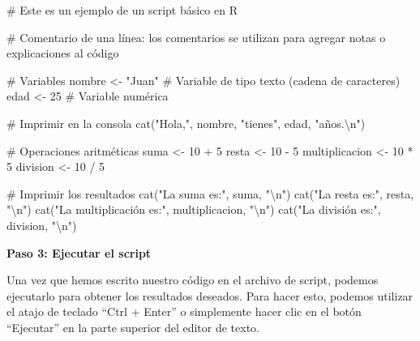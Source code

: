 \documentclass[
  a4paper,
]{article}
\newenvironment{Shaded}{}{}
\newcommand{\CommentTok}[1]{\textcolor[rgb]{0.42,0.45,0.49}{#1}}
\newcommand{\DecValTok}[1]{\textcolor[rgb]{0.00,0.36,0.77}{#1}}
\newcommand{\FunctionTok}[1]{\textcolor[rgb]{0.44,0.26,0.76}{#1}}
\newcommand{\NormalTok}[1]{\textcolor[rgb]{0.14,0.16,0.18}{#1}}
\newcommand{\OtherTok}[1]{\textcolor[rgb]{0.44,0.26,0.76}{#1}}
\newcommand{\SpecialCharTok}[1]{\textcolor[rgb]{0.00,0.36,0.77}{#1}}
\newcommand{\StringTok}[1]{\textcolor[rgb]{0.01,0.18,0.38}{#1}}
\begin{document}
\begin{Shaded}
\begin{Highlighting}[]
\CommentTok{\# Este es un ejemplo de un script básico en R}

\CommentTok{\# Comentario de una línea: los comentarios se utilizan para agregar notas o explicaciones al código}

\CommentTok{\# Variables}
\NormalTok{nombre }\OtherTok{\textless{}{-}} \StringTok{"Juan"} \CommentTok{\# Variable de tipo texto (cadena de caracteres)}
\NormalTok{edad }\OtherTok{\textless{}{-}} \DecValTok{25} \CommentTok{\# Variable numérica}

\CommentTok{\# Imprimir en la consola}
\FunctionTok{cat}\NormalTok{(}\StringTok{"Hola,"}\NormalTok{, nombre, }\StringTok{"tienes"}\NormalTok{, edad, }\StringTok{"años.}\SpecialCharTok{\textbackslash{}n}\StringTok{"}\NormalTok{)}

\CommentTok{\# Operaciones aritméticas}
\NormalTok{suma }\OtherTok{\textless{}{-}} \DecValTok{10} \SpecialCharTok{+} \DecValTok{5}
\NormalTok{resta }\OtherTok{\textless{}{-}} \DecValTok{10} \SpecialCharTok{{-}} \DecValTok{5}
\NormalTok{multiplicacion }\OtherTok{\textless{}{-}} \DecValTok{10} \SpecialCharTok{*} \DecValTok{5}
\NormalTok{division }\OtherTok{\textless{}{-}} \DecValTok{10} \SpecialCharTok{/} \DecValTok{5}

\CommentTok{\# Imprimir los resultados}
\FunctionTok{cat}\NormalTok{(}\StringTok{"La suma es:"}\NormalTok{, suma, }\StringTok{"}\SpecialCharTok{\textbackslash{}n}\StringTok{"}\NormalTok{)}
\FunctionTok{cat}\NormalTok{(}\StringTok{"La resta es:"}\NormalTok{, resta, }\StringTok{"}\SpecialCharTok{\textbackslash{}n}\StringTok{"}\NormalTok{)}
\FunctionTok{cat}\NormalTok{(}\StringTok{"La multiplicación es:"}\NormalTok{, multiplicacion, }\StringTok{"}\SpecialCharTok{\textbackslash{}n}\StringTok{"}\NormalTok{)}
\FunctionTok{cat}\NormalTok{(}\StringTok{"La división es:"}\NormalTok{, division, }\StringTok{"}\SpecialCharTok{\textbackslash{}n}\StringTok{"}\NormalTok{)}
\end{Highlighting}
\end{Shaded}

\textbf{Paso 3: Ejecutar el script}

Una vez que hemos escrito nuestro código en el archivo de script,
podemos ejecutarlo para obtener los resultados deseados. Para hacer
esto, podemos utilizar el atajo de teclado ``Ctrl + Enter'' o
simplemente hacer clic en el botón ``Ejecutar'' en la parte superior del
editor de texto.
\end{document}
